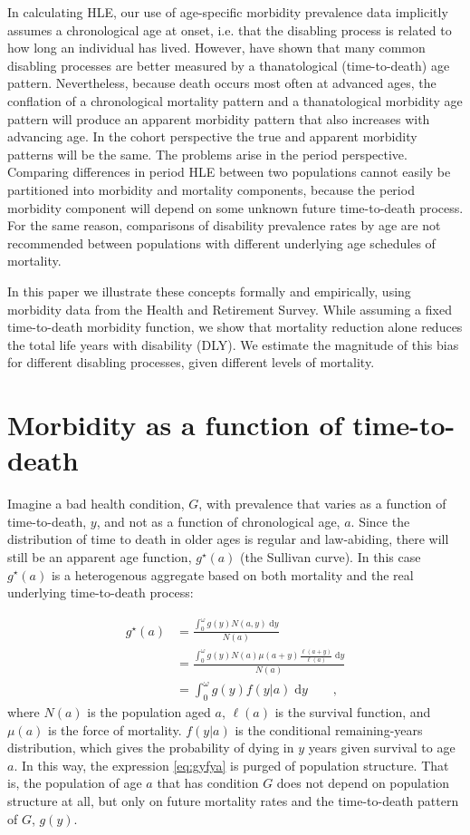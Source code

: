 \documentclass[11pt,oneside,a4paper]{article} %
\newcommand{\dd}{\; \mathrm{d}}
\newcommand{\tc}{\quad\quad\text{,}}
\begin{document}
In calculating HLE, our use of age-specific morbidity prevalence data implicitly assumes a chronological age at onset, i.e. that the disabling process is related to how long an individual has lived. However, \citet{riffe2015ttd} have shown that many common disabling processes are better measured by a thanatological (time-to-death) age pattern. Nevertheless, because death occurs most often at advanced ages, the conflation of a chronological mortality pattern and a thanatological morbidity age pattern will produce an apparent morbidity pattern that also increases with advancing age. In the cohort perspective the true and apparent morbidity patterns will be the same. The problems arise in the period perspective. Comparing differences in period HLE between two populations cannot easily be partitioned into morbidity and mortality components, because the period morbidity component will depend on some unknown future time-to-death process. For the same reason, comparisons of disability prevalence rates by age are not recommended between populations with different underlying age schedules of mortality.

In this paper we illustrate these concepts formally and empirically, using morbidity data from the Health and Retirement Survey. While assuming a fixed time-to-death morbidity function, we show that mortality reduction alone reduces the total life years with disability (DLY). We estimate the magnitude of this bias for different disabling processes, given different levels of mortality. 


\section{Morbidity as a function of time-to-death}
 
Imagine a bad health condition, $G$, with prevalence that varies as a
function of time-to-death, $y$, and not as a function of chronological age, $a$.
Since the distribution of time to death in older ages is regular and law-abiding, there will still be an
apparent age function, $g^\star(a)$ (the Sullivan curve).
In this case $g^\star(a)$ is a heterogenous aggregate based on both mortality
and the real underlying time-to-death process:
 
\begin{align}
g^\star(a) &= \frac{\int _0^\omega g(y) N(a,y) \dd y}{N(a)} \\
      &= \frac{\int _0^\omega g(y) N(a)
      \mu(a+y)\frac{\ell(a+y)}{\ell(a)}\dd y}{N(a)}\\
      &= \int _0^\omega g(y) f(y|a)\dd y \label{eq:gyfya}\tc
\end{align}
where $N(a)$ is the population aged $a$, $\ell(a)$ is the survival function, and
$\mu(a)$ is the force of mortality. $f(y|a)$ is the conditional remaining-years
distribution, which gives the probability of dying in $y$ years given survival
to age $a$. In this way, the expression \eqref{eq:gyfya} is purged of population
structure.
That is, the population of age $a$ that has condition $G$ does not depend on population structure at all, but only
on future mortality rates and the time-to-death pattern of $G$, $g(y)$. 
\end{document}

